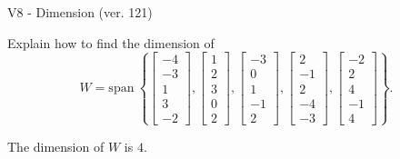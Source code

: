 \begin{exercise}
  \begin{exerciseTitle}V8 - Dimension (ver. 121)\end{exerciseTitle}
  \begin{exerciseStatement}
    Explain how to find the dimension of 
\[W=\mathrm{span}\ \left\{\left[\begin{array}{r}
-4 \\
-3 \\
1 \\
3 \\
-2
\end{array}\right] , \left[\begin{array}{r}
1 \\
2 \\
3 \\
0 \\
2
\end{array}\right] , \left[\begin{array}{r}
-3 \\
0 \\
1 \\
-1 \\
2
\end{array}\right] , \left[\begin{array}{r}
2 \\
-1 \\
2 \\
-4 \\
-3
\end{array}\right] , \left[\begin{array}{r}
-2 \\
2 \\
4 \\
-1 \\
4
\end{array}\right]\right\}.\]



  \end{exerciseStatement}
  \begin{exerciseAnswer}
   The dimension of \(W\) is  \(4\).
  


  \end{exerciseAnswer}
\end{exercise}